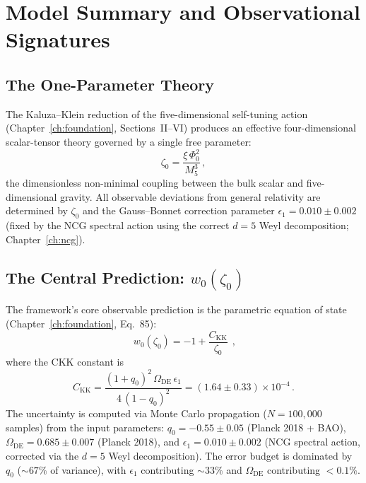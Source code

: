 \section{Model Summary and Observational Signatures}
\label{sec:2-model}

\subsection{The One-Parameter Theory}
\label{sec:2-one-param}

The Kaluza--Klein reduction of the five-dimensional self-tuning action (Chapter~\ref{ch:foundation}, Sections~II--VI) produces an effective four-dimensional scalar-tensor theory governed by a single free parameter:
\begin{equation}
\zeta_0 = \frac{\xi\,\Phi_0^2}{M_5^3}\,,
\label{eq:2-zeta0}
\end{equation}
the dimensionless non-minimal coupling between the bulk scalar and five-dimensional gravity. All observable deviations from general relativity are determined by $\zeta_0$ and the Gauss--Bonnet correction parameter $\epsilon_1 = 0.010 \pm 0.002$ (fixed by the NCG spectral action using the correct $d = 5$ Weyl decomposition; Chapter~\ref{ch:ncg}).

\subsection{The Central Prediction: $w_0(\zeta_0)$}
\label{sec:2-w0curve}

The framework's core observable prediction is the parametric equation of state (Chapter~\ref{ch:foundation}, Eq.~85):
\begin{equation}
\boxed{\;w_0(\zeta_0) = -1 + \frac{C_\mathrm{KK}}{\zeta_0}\;}\,,
\label{eq:2-w0-parametric}
\end{equation}
where the CKK constant is
\begin{equation}
C_\mathrm{KK} = \frac{(1+q_0)^2\,\Omega_\mathrm{DE}\,\epsilon_1}{4\,(1-q_0)^2} = (1.64 \pm 0.33) \times 10^{-4}\,.
\label{eq:2-CKK}
\end{equation}
The uncertainty is computed via Monte Carlo propagation ($N = 100{,}000$ samples) from the input parameters: $q_0 = -0.55 \pm 0.05$ (Planck 2018 + BAO), $\Omega_\mathrm{DE} = 0.685 \pm 0.007$ (Planck 2018), and $\epsilon_1 = 0.010 \pm 0.002$ (NCG spectral action, corrected via the $d = 5$ Weyl decomposition). The error budget is dominated by $q_0$ (${\sim}67\%$ of variance), with $\epsilon_1$ contributing ${\sim}33\%$ and $\Omega_\mathrm{DE}$ contributing $< 0.1\%$.

